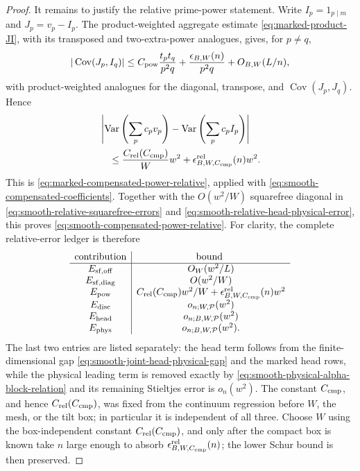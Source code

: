 \documentclass[11pt]{article}
\numberwithin{equation}{section}
\theoremstyle{definition}
\theoremstyle{remark}
\newcommand{\1}{\mathbf 1}
\begin{document}
\begin{proof}
It remains to justify the relative prime-power statement.  Write
\(I_p=1_{p\mid m}\) and \(J_p=v_p-I_p\).
The product-weighted aggregate estimate
\eqref{eq:marked-product-JI}, with its transposed and two-extra-power
analogues, gives, for \(p\ne q\),
\begin{equation}
 |\operatorname{Cov}(J_p,I_q)|
 \le C_{\rm pow}\frac{t_pt_q}{p^2q}
       +\frac{\epsilon_{B,W}(n)}{p^2q}
       +O_{B,W}(L/n),
\label{eq:smooth-JI-bound}
\end{equation}
with product-weighted analogues for the diagonal, transpose, and
\(\operatorname{Cov}(J_p,J_q)\).  Hence
\begin{align}
 &\left|\operatorname{Var}\left(\sum_pc_pv_p\right)
       -\operatorname{Var}\left(\sum_pc_pI_p\right)\right|
 \notag\\
 &\quad\le
 \frac{C_{\rm rel}(C_{\rm cmp})}{W}w^2
       +\epsilon^{\rm rel}_{B,W,C_{\rm cmp}}(n)w^2.
\label{eq:smooth-power-variance-calculation}
\end{align}
This is \eqref{eq:marked-compensated-power-relative}, applied with
\eqref{eq:smooth-compensated-coefficients}.  Together with the
\(O(w^2/W)\) squarefree diagonal in
\eqref{eq:smooth-relative-squarefree-errors} and
\eqref{eq:smooth-relative-head-physical-error}, this proves
\eqref{eq:smooth-compensated-power-relative}.  For clarity, the complete
relative-error ledger is therefore
\begin{equation}
 \begin{array}{c|c}
 \text{contribution}&\text{bound}\ 
 \\ \hline
 E_{\rm sf,off}&O_W(w^2/L)\\
 E_{\rm sf,diag}&O(w^2/W)\\
 E_{\rm pow}&C_{\rm rel}(C_{\rm cmp})w^2/W
                  +\epsilon^{\rm rel}_{B,W,C_{\rm cmp}}(n)w^2\\
 E_{\rm disc}&o_{n;W,\mathcal P}(w^2)\\
 E_{\rm head}&o_{n;B,W,\mathcal P}(w^2)\\
 E_{\rm phys}&o_{n;B,W,\mathcal P}(w^2).
 \end{array}
 \label{eq:smooth-complete-relative-error-ledger}
\end{equation}
The last two entries are listed separately: the head term follows from
the finite-dimensional gap \eqref{eq:smooth-joint-head-physical-gap}
and the marked head rows, while the physical leading term is removed
exactly by \eqref{eq:smooth-physical-alpha-block-relation} and its
remaining Stieltjes error is \(o_n(w^2)\).  The constant
\(C_{\rm cmp}\), and hence \(C_{\rm rel}(C_{\rm cmp})\), was fixed from
the continuum regression before \(W\), the mesh, or the tilt box; in
particular it is independent of all three.  Choose \(W\) using the
box-independent constant \(C_{\rm rel}(C_{\rm cmp})\), and only after
the compact box is known take \(n\) large enough to absorb
\(\epsilon^{\rm rel}_{B,W,C_{\rm cmp}}(n)\); the lower Schur bound is
then preserved.


\end{proof}
\end{document}
